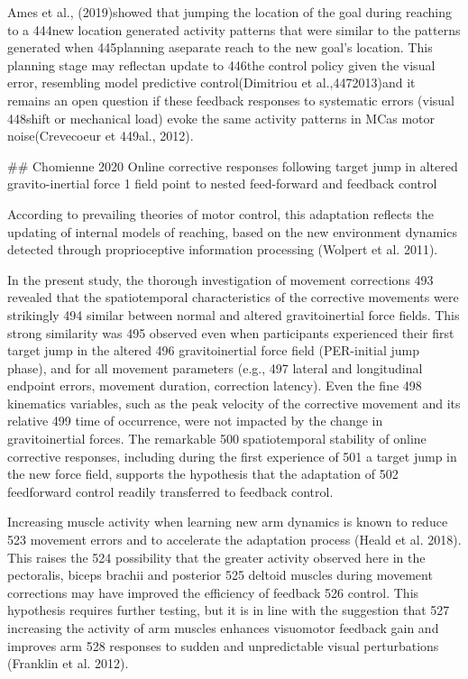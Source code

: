 \documentclass[../main.tex]{subfiles}
\begin{document}
{{Ames et al., (2019)showed that jumping the location of the goal during reaching to a 444new location generated activity patterns that were similar to the patterns generated when 445planning aseparate reach to the new goal’s location. This planning stage may reflectan update to 446the control policy given the visual error, resembling model predictive control(Dimitriou et al.,4472013)and it remains an open question if these feedback responses to systematic errors (visual 448shift or mechanical load) evoke the same activity patterns in MCas motor noise(Crevecoeur et 449al., 2012).

## Chomienne 2020 Online corrective responses following target jump in altered gravito-inertial force 1 field point to nested feed-forward and feedback control

According to prevailing theories of motor control, this adaptation reflects the updating of internal models of reaching, based on the new environment dynamics detected through proprioceptive information processing (Wolpert et al. 2011).

In the present study, the thorough investigation of movement corrections 493 revealed that the spatiotemporal characteristics of the corrective movements were strikingly 494 similar  between  normal  and  altered  gravitoinertial  force  fields.  This  strong  similarity  was 495 observed  even  when  participants  experienced  their  first  target jump  in  the  altered 496 gravitoinertial force field (PER-initial jump phase), and for all movement parameters (e.g., 497 lateral and longitudinal endpoint errors, movement duration, correction latency). Even the fine 498 kinematics variables, such as the peak velocity of the corrective movement and its relative 499 time of occurrence, were not impacted by the change in gravitoinertial forces. The remarkable 500 spatiotemporal stability of online corrective responses, including during the first experience of 501 a  target  jump  in  the  new  force  field,  supports  the  hypothesis  that  the  adaptation  of 502 feedforward control readily transferred to feedback control.

Increasing  muscle  activity  when  learning  new  arm  dynamics  is  known  to  reduce 523 movement errors and to accelerate the adaptation process (Heald et al. 2018). This raises the 524 possibility that the greater activity observed here in the pectoralis, biceps brachii and posterior 525 deltoid muscles during movement corrections may have improved the efficiency of feedback 526 control.  This  hypothesis  requires  further  testing,  but  it  is  in  line  with  the  suggestion  that 527 increasing the activity of arm muscles enhances visuomotor feedback gain and improves arm 528 responses to sudden and unpredictable visual perturbations (Franklin et al. 2012).

}}
\end{document}
